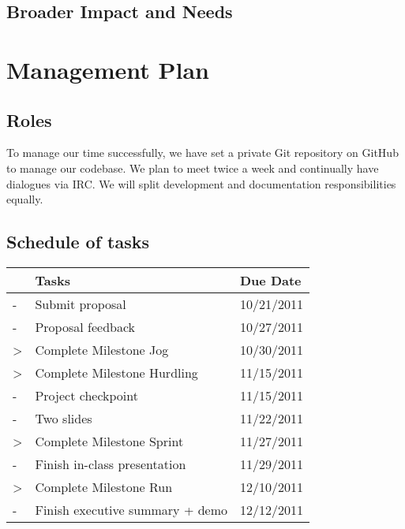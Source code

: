 \documentclass{article}
\begin{document}
\subsection{Broader Impact and Needs}

\section{Management Plan}
\subsection{Roles}
To manage our time successfully, we have set a private Git repository on GitHub to manage our codebase. 
We plan to meet twice a week and continually have dialogues via IRC. We will split development and documentation
responsibilities equally.

\subsection{Schedule of tasks}
\begin{tabular}{|l|l|l|}
\hline
  & Tasks                             & Due Date   \\ \hline
- & Submit proposal                   & 10/21/2011 \\
- & Proposal feedback                 & 10/27/2011 \\
> & Complete Milestone Jog            & 10/30/2011 \\
> & Complete Milestone Hurdling       & 11/15/2011 \\
- & Project checkpoint                & 11/15/2011 \\
- & Two slides                        & 11/22/2011 \\
> & Complete Milestone Sprint         & 11/27/2011 \\
- & Finish in-class presentation      & 11/29/2011 \\
> & Complete Milestone Run            & 12/10/2011 \\
- & Finish executive summary + demo   & 12/12/2011 \\
\hline
\end{tabular}
\end{document}
